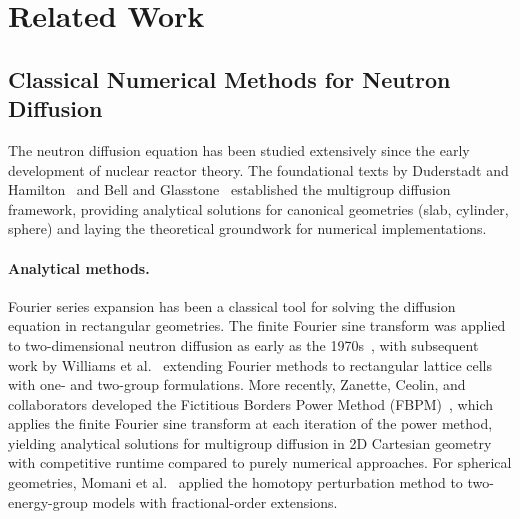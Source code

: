 \section{Related Work}
\label{sec:related_work}

\subsection{Classical Numerical Methods for Neutron Diffusion}
\label{sec:rw_classical}

The neutron diffusion equation has been studied extensively since the early development of nuclear reactor theory.
The foundational texts by Duderstadt and Hamilton~\cite{duderstadt1976nuclear} and Bell and Glasstone~\cite{bell1970nuclear} established the multigroup diffusion framework, providing analytical solutions for canonical geometries (slab, cylinder, sphere) and laying the theoretical groundwork for numerical implementations.

\paragraph{Analytical methods.}
Fourier series expansion has been a classical tool for solving the diffusion equation in rectangular geometries.
The finite Fourier sine transform was applied to two-dimensional neutron diffusion as early as the 1970s~\cite{osti1974fourier}, with subsequent work by Williams et al.~\cite{williams2013fourier} extending Fourier methods to rectangular lattice cells with one- and two-group formulations.
More recently, Zanette, Ceolin, and collaborators developed the Fictitious Borders Power Method (FBPM)~\cite{zanette2018fourier}, which applies the finite Fourier sine transform at each iteration of the power method, yielding analytical solutions for multigroup diffusion in 2D Cartesian geometry with competitive runtime compared to purely numerical approaches.
For spherical geometries, Momani et al.~\cite{momani2024twogroup} applied the homotopy perturbation method to two-energy-group models with fractional-order extensions.


